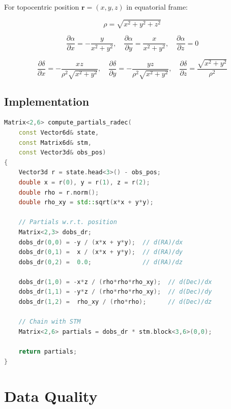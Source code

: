 For topocentric position $\mathbf{r} = (x, y, z)$ in equatorial frame:

\begin{equation}
    \rho = \sqrt{x^2 + y^2 + z^2}
\end{equation}

\begin{equation}
    \frac{\partial\alpha}{\partial x} = -\frac{y}{x^2 + y^2}, \quad
    \frac{\partial\alpha}{\partial y} = \frac{x}{x^2 + y^2}, \quad
    \frac{\partial\alpha}{\partial z} = 0
\end{equation}

\begin{equation}
    \frac{\partial\delta}{\partial x} = -\frac{xz}{\rho^2\sqrt{x^2+y^2}}, \quad
    \frac{\partial\delta}{\partial y} = -\frac{yz}{\rho^2\sqrt{x^2+y^2}}, \quad
    \frac{\partial\delta}{\partial z} = \frac{\sqrt{x^2+y^2}}{\rho^2}
\end{equation}

\subsection{Implementation}

\begin{lstlisting}[language=C++,caption={Computing observation partials}]
Matrix<2,6> compute_partials_radec(
    const Vector6d& state,
    const Matrix6d& stm,
    const Vector3d& obs_pos)
{
    Vector3d r = state.head<3>() - obs_pos;
    double x = r(0), y = r(1), z = r(2);
    double rho = r.norm();
    double rho_xy = std::sqrt(x*x + y*y);
    
    // Partials w.r.t. position
    Matrix<2,3> dobs_dr;
    dobs_dr(0,0) = -y / (x*x + y*y);  // d(RA)/dx
    dobs_dr(0,1) =  x / (x*x + y*y);  // d(RA)/dy
    dobs_dr(0,2) =  0.0;              // d(RA)/dz
    
    dobs_dr(1,0) = -x*z / (rho*rho*rho_xy);  // d(Dec)/dx
    dobs_dr(1,1) = -y*z / (rho*rho*rho_xy);  // d(Dec)/dy
    dobs_dr(1,2) =  rho_xy / (rho*rho);      // d(Dec)/dz
    
    // Chain with STM
    Matrix<2,6> partials = dobs_dr * stm.block<3,6>(0,0);
    
    return partials;
}
\end{lstlisting}

\section{Data Quality}

